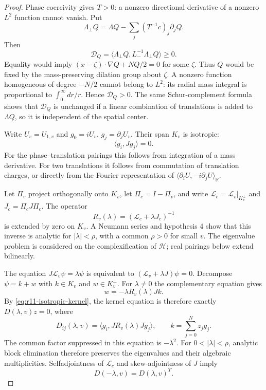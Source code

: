 \begin{proof}
Phase coercivity gives $T>0$: a nonzero directional derivative of a
nonzero $L^2$ function cannot vanish. Put
\[
 \Lambda_\perp Q=
 \Lambda Q-\sum_j(T^{-1}c)_j\partial_jQ.
\]
Then
\[
 \mathcal D_Q=
 \langle\Lambda_\perp Q,L_-^{-1}\Lambda_\perp Q\rangle\geq0.
\]
Equality would imply
$(x-\zeta)\cdot\nabla Q+NQ/2=0$ for some $\zeta$.
Thus $Q$ would be fixed by the mass-preserving dilation group about
$\zeta$. A nonzero function homogeneous of degree $-N/2$ cannot belong
to $L^2$: its radial mass integral is proportional to $\int_0^\infty dr/r$.
Hence $\mathcal D_Q>0$. The same Schur-complement formula shows that
$\mathcal D_Q$ is unchanged if a linear combination of translations is
added to $\Lambda Q$, so it is independent of the spatial center.

Write $U_v=U_{1,v}$ and
$g_0=iU_v$, $g_j=\partial_jU_v$. Their span $K_v$ is isotropic:
\begin{equation}\label{eq:r11-isotropic-kernel}
 \langle g_i,Jg_j\rangle=0.
\end{equation}
For the phase--translation pairings this follows from integration of a
mass derivative. For two translations it follows from commutation of
translation charges, or directly from the Fourier representation of
$\langle\partial_iU,-i\partial_jU\rangle_{\mathbb R}$.

Let $\Pi_v$ project orthogonally onto $K_v$, let $\Pi_c=I-\Pi_v$, and
write $\mathcal L_c=\mathcal L_v|_{K_v^\perp}$ and
$J_c=\Pi_cJ\Pi_c$. The operator
\[
 R_v(\lambda)=(\mathcal L_c+\lambda J_c)^{-1}
\]
is extended by zero on $K_v$. A Neumann series and hypothesis 4 show
that this inverse is analytic for $|\lambda|<\rho$, with a common
$\rho>0$ for small $v$. The eigenvalue problem is considered on the
complexification of $\mathcal H$; real pairings below extend bilinearly.

The equation $J\mathcal L_v\psi=\lambda\psi$ is equivalent to
$(\mathcal L_v+\lambda J)\psi=0$. Decompose $\psi=k+w$ with
$k\in K_v$ and $w\in K_v^\perp$. For $\lambda\ne0$ the complementary
equation gives
\[
 w=-\lambda R_v(\lambda)Jk.
\]
By \eqref{eq:r11-isotropic-kernel}, the kernel equation is therefore
exactly $D(\lambda,v)z=0$, where
\begin{equation}\label{eq:r11-reduced-matrix}
 D_{ij}(\lambda,v)
  =\langle g_i,J R_v(\lambda)Jg_j\rangle,
 \qquad k=\sum_{j=0}^Nz_jg_j.
\end{equation}
The common factor suppressed in this equation is $-\lambda^2$.
For $0<|\lambda|<\rho$, analytic block elimination therefore preserves
the eigenvalues and their algebraic multiplicities. Selfadjointness of
$\mathcal L_c$ and skew-adjointness of $J$ imply
\begin{equation}\label{eq:r11-reduced-transpose}
 D(-\lambda,v)=D(\lambda,v)^T.
\end{equation}


\end{proof}
